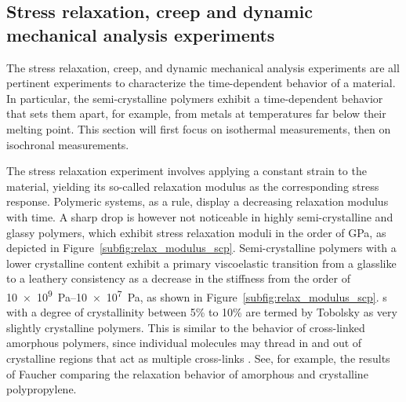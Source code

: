 \subsection{Stress relaxation, creep  and dynamic mechanical analysis experiments}
\label{sec:relax_creep_dma}

The stress relaxation, creep, and dynamic mechanical analysis experiments are all pertinent experiments to characterize the time-dependent behavior of a material.
In particular, the semi-crystalline polymers exhibit a time-dependent behavior that sets them apart, for example, from metals at temperatures far below their melting point.
This section will first focus on isothermal measurements, then on isochronal measurements.

The stress relaxation experiment involves applying a constant strain to the material, yielding its so-called relaxation modulus as the corresponding stress response.
Polymeric systems, as a rule, display a decreasing relaxation modulus with time.
A sharp drop is however not noticeable in highly semi-crystalline and glassy polymers, which exhibit stress relaxation moduli in the order of \si{\giga\pascal}, as depicted in Figure~\ref{subfig:relax_modulus_scp}.
Semi-crystalline polymers with a lower crystalline content exhibit a primary viscoelastic transition from a glasslike to a leathery consistency as a decrease in the stiffness from the order of \SIrange{10e9}{10e7}{\pascal}, as shown in Figure~\ref{subfig:relax_modulus_scp}.
s with a degree of crystallinity between 5\% to 10\% are termed by Tobolsky \citep{tobolskyPropertiesStructurePolymers1960} as very slightly crystalline polymers.
This is similar to the behavior of cross-linked amorphous polymers, since individual molecules may thread in and out of crystalline regions that act as multiple cross-links \citep{ferryViscoelasticPropertiesPolymers1980, gsellYieldTransientEffects1981}.
See, for example, the results of Faucher \citep{faucherViscoelasticBehaviorPolyethylene1959} comparing the relaxation behavior of amorphous and crystalline polypropylene.


